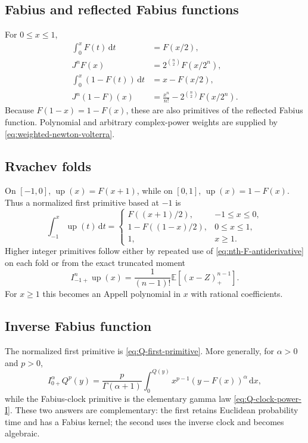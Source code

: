 \documentclass[11pt,oneside]{article}
\numberwithin{equation}{section}
\theoremstyle{plain}
\theoremstyle{definition}
\theoremstyle{remark}
\newcommand{\E}{\mathbb E}
\newcommand{\Up}{\operatorname{up}}
\newcommand{\dd}{\,\mathrm d}
\begin{document}
\subsection{Fabius and reflected Fabius functions}

For $0\le x\le1$,
\begin{align}
 \int_0^xF(t)\dd t
 &=F(x/2),
 \label{eq:first-F-antiderivative}\\
 J^nF(x)
 &=2^{\binom n2}F(x/2^n),
 \label{eq:nth-F-antiderivative}\\
 \int_0^x(1-F(t))\dd t
 &=x-F(x/2),
 \label{eq:first-survival-antiderivative}\\
 J^n(1-F)(x)
 &=\frac{x^n}{n!}-2^{\binom n2}F(x/2^n).
 \label{eq:nth-survival-antiderivative}
\end{align}
Because $F(1-x)=1-F(x)$, these are also primitives of the reflected Fabius
function.  Polynomial and arbitrary complex-power weights are supplied by
\cref{eq:weighted-newton-volterra}.

\subsection{Rvachev folds}

On $[-1,0]$, $\Up(x)=F(x+1)$, while on $[0,1]$,
$\Up(x)=1-F(x)$.  Thus a normalized first primitive based at $-1$ is
\begin{equation}
 \int_{-1}^x\Up(t)\dd t
 =\begin{cases}
 F((x+1)/2),&-1\le x\le0,\\[1mm]
 1-F((1-x)/2),&0\le x\le1,\\[1mm]
 1,&x\ge1.
 \end{cases}
 \label{eq:up-first-piecewise}
\end{equation}
Higher integer primitives follow either by repeated use of
\cref{eq:nth-F-antiderivative} on each fold or from the exact truncated moment
\begin{equation}
 I_{-1+}^n\Up(x)
 =\frac1{(n-1)!}\E[(x-Z)_+^{n-1}].
 \label{eq:up-n-incomplete-moment}
\end{equation}
For $x\ge1$ this becomes an Appell polynomial in $x$ with rational
coefficients.

\subsection{Inverse Fabius function}

The normalized first primitive is \cref{eq:Q-first-primitive}.  More generally,
for $\alpha>0$ and $p>0$,
\begin{equation}
 I_{0+}^\alpha Q^p(y)
 =\frac{p}{\Gamma(\alpha+1)}
   \int_0^{Q(y)}x^{p-1}(y-F(x))^\alpha\dd x,
 \label{eq:inverse-fractional-antiderivative-catalog}
\end{equation}
while the Fabius-clock primitive is the elementary gamma law
\cref{eq:Q-clock-power-I}.  These two answers are complementary: the first
retains Euclidean probability time and has a Fabius kernel; the second uses
the inverse clock and becomes algebraic.
\end{document}
